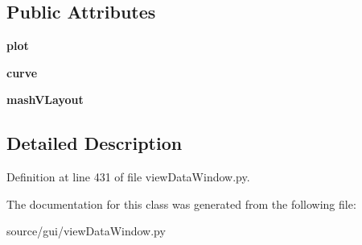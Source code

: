 \subsection*{Public Attributes}
\begin{DoxyCompactItemize}
\item 
\mbox{\label{classview_data_window_1_1_mash_tab_ac1416b7e995f1dec3a1abcd12416c217}} 
{\bfseries plot}
\item 
\mbox{\label{classview_data_window_1_1_mash_tab_a6e0115f8481809e2f3c6249cfc89f96e}} 
{\bfseries curve}
\item 
\mbox{\label{classview_data_window_1_1_mash_tab_ab96aa5015bb2f5e3d60ac9b20483358b}} 
{\bfseries mash\+V\+Layout}
\end{DoxyCompactItemize}


\subsection{Detailed Description}


Definition at line 431 of file view\+Data\+Window.\+py.



The documentation for this class was generated from the following file\+:\begin{DoxyCompactItemize}
\item 
source/gui/view\+Data\+Window.\+py\end{DoxyCompactItemize}
